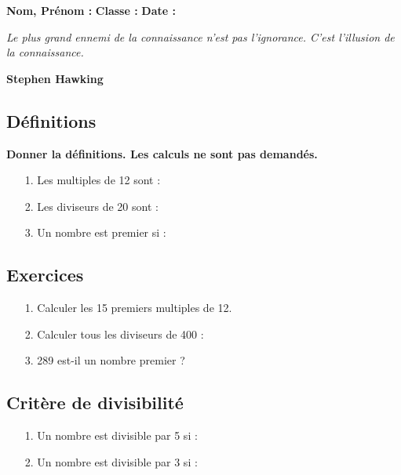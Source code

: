 \newpage

\textbf{Nom, Prénom :} \hspace{8cm} \textbf{Classe :} \hspace{3cm} \textbf{Date :}\\

\begin{center}
  \textit{Le plus grand ennemi de la connaissance n'est pas l'ignorance. C'est l'illusion de la connaissance.}  
  
  \textbf{Stephen Hawking}
\end{center}


\subsection*{Définitions}
\textbf{Donner la définitions. Les calculs ne sont pas demandés.}
  \begin{enumerate}
    \item[1.] Les multiples de 12 sont : \dotfill \\
    \Pointilles[2]
    \item[2.] Les diviseurs de 20 sont : \dotfill \\
    \Pointilles[2]
    \item[3.] Un nombre est premier si : \dotfill \\
    \Pointilles[1]
  \end{enumerate}

  \subsection*{Exercices}

    \begin{enumerate}
      \item[1.] Calculer les 15 premiers multiples de 12.\\
      \Pointilles[6]
      \item[2.] Calculer tous les diviseurs de 400 : \dotfill \\
      \Pointilles[6]
      \item[3.] 289 est-il un nombre premier ? \\
      \Pointilles[5]
    \end{enumerate}
  
\newpage

    \subsection*{Critère de divisibilité}
      \begin{enumerate}
        \item[1.] Un nombre est divisible par 5 si : \dotfill \\
        \Pointilles[2]
        \item[2.] Un nombre est divisible par 3 si :  \dotfill \\
        \Pointilles[2]
      \end{enumerate}
    
